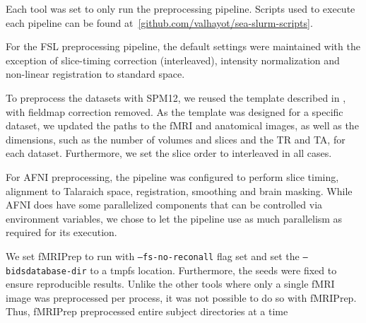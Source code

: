     Each tool was set to only run the preprocessing pipeline. Scripts used to execute each pipeline can be found at~\ref{github.com/valhayot/sea-slurm-scripts}.
    
    For the FSL preprocessing pipeline, the default settings were maintained with the exception of slice-timing correction (interleaved),
    intensity normalization and non-linear registration to standard space.
    
    To preprocess the datasets with SPM12, we reused the template described in \cite{haitas2021}, with fieldmap correction removed.
    As the template was designed for a specific dataset, we updated the paths to the fMRI and anatomical images,
    as well as the dimensions, such as the number of volumes and slices and the TR and TA, for each dataset. Furthermore,
    we set the slice order to interleaved in all cases. 
    
    For AFNI preprocessing, the pipeline was configured to perform slice timing, alignment to Talaraich space, registration, smoothing
    and brain masking. While AFNI does have some parallelized components that can be controlled via environment variables, we chose to let 
    the pipeline use as much parallelism as required for its execution.
    
    We set fMRIPrep to run with \texttt{--fs-no-reconall} flag set and set the \texttt{--bids\-database-dir} to a tmpfs location. 
    Furthermore, the seeds were fixed to ensure reproducible results. Unlike the other tools where only a single fMRI image was preprocessed
    per process, it was not possible to do so with fMRIPrep. Thus, fMRIPrep preprocessed entire subject directories at a time

    
    \begin{table}[t]
      \small\centering
      \caption{Pipeline execution characteristics}\label{table:pipelines}
    \end{table}
